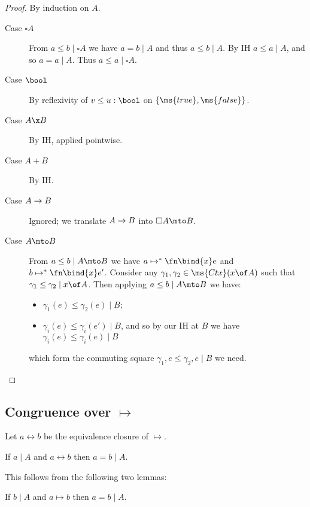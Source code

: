 \documentclass{article}
\newcommand{\step}{\mapsto}
\newcommand{\steps}{\step^*}
\newcommand{\betaeq}{\leftrightarrow}
\newcommand{\disc}[1]{\square{#1}}
\newcommand{\lr}[2]{#2\mathrel{|}#1}
\newcommand{\commsq}[5]{\lr{#1}{{#2}, {#4} \le {#3}, {#5}}}
\begin{document}
\begin{proof}
  By induction on $A$.
  \begin{description}
  \item[Case $\disc{A}$] From $\lr{\disc{A}}{a \le b}$ we have $\lr{A}{a = b}$
    and thus $\lr{A}{a \le b}$. By IH $\lr{A}{a \le a}$, and so $\lr{A}{a = a}$.
    Thus $\lr{\disc{A}}{a \le a}$.
  \item[Case $\bool$] By reflexivity of $v \le u : \bool$ on $\{\ms{true},\ms{false}\}$.
  \item[Case $A \x B$] By IH, applied pointwise. 
  \item[Case $A + B$] By IH. 
  \item[Case $A \to B$] Ignored; we translate $A \to B$ into $\disc{A} \mto B$.
  \item[Case $A \mto B$] From $\lr{A \mto B}{a \le b}$ we have $a \steps
    \fn\bind{x} e$ and $b \steps \fn\bind{x} e'$. Consider any $\gamma_1,
    \gamma_2 \in \ms{Ctx}(x \of A)$ such that $\lr{x\of A}{\gamma_1 \le
      \gamma_2}$. Then applying $\lr{A \mto B}{a \le b}$ we have:
    \begin{itemize}
    \item $\lr{B}{\gamma_1(e) \le \gamma_2(e)}$;
    \item $\lr{B}{\gamma_i(e) \le \gamma_i(e')}$, and so by our IH at $B$ we
      have $\lr{B}{\gamma_i(e) \le \gamma_i(e)}$
    \end{itemize}
    which form the commuting square $\commsq{B}{\gamma_1}{\gamma_2}{e}{e}$ we
    need.

  \end{description}
\end{proof}


\subsection{Congruence over $\step$}

Let $a \betaeq b$ be the equivalence closure of $\step$.

\begin{theorem}\label{thm:congbeta}
  If $\lr{A}{a}$ and $a \betaeq b$ then $\lr{A}{a = b}$.
\end{theorem}

This follows from the following two lemmas:

\begin{lemma}
  If $\lr{A}{b}$ and $a \step b$ then $\lr{A}{a = b}$.
\end{lemma}
\end{document}
